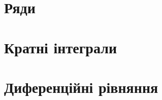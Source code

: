 \documentclass[a4paper, 12pt, oneside]{extreport}
\begin{document}


\chapter{Ряди}




% 
% 
% 
\chapter{Кратні інтеграли}
\setcounter{subsection}{9}





\setcounter{subsection}{14}


\chapter{Диференційні рівняння}




\setcounter{subsection}{7}

\setcounter{subsection}{19}



\end{document}
